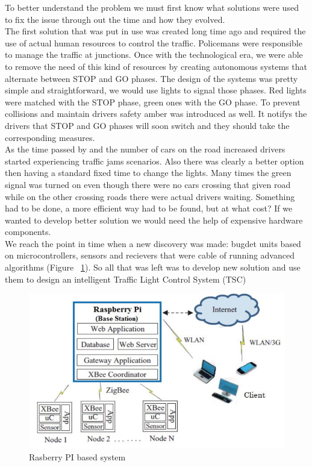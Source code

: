 \documentclass[17pt]{article}
\begin{document}
\indent \indent
To better understand the problem we must first know what solutions
were used to fix the issue through out the time and how they evolved.\\
\indent \indent
The first solution that was put in use was created long time ago and required
the use of actual human resources to control the traffic. Policemans were
responsible to manage the traffic at junctions. Once with the  technological
era, we were able to remove the need of this kind of resources by creating
autonomous systems that alternate between STOP and GO phases. The design of the 
systems was pretty simple and straightforward, we would use lights to signal 
those phases. Red lights were matched with the STOP phase, green ones with the
GO phase. To prevent collisions and maintain drivers safety amber was
introduced as well. It notifys the drivers that STOP and GO phases will soon
switch and they should take the corresponding measures.\\
\indent \indent
As the time passed by and the number of cars on the road increased drivers 
started experiencing traffic jams scenarios. Also there was clearly a better
option then having a standard fixed time to change the lights. Many times
the green signal was turned on even though there were no cars crossing that
given road while on the other crossing roads there were actual drivers waiting.
Something had to be done, a more efficient way had to be found, but at what
cost? If we wanted to develop better solution we would need the help of
expensive hardware components.\\
\indent \indent
We reach the point in time when a new discovery was made: bugdet units based
on  microcontrollers, sensors and recievers \cite{Deshmukh2016} that were
cable of running advanced algorithms (Figure ~\ref{fig:PI}). So all that was left was to develop 
new solution and use them to design an intelligent Traffic Light Control
System (TSC)\\
\begin{figure}[h!]
    \includegraphics[width=\textwidth]{PiSystems.png}
    \caption{Rasberry PI based system \textcopyright }
    \label{fig:PI}
\end{figure}
\\
\end{document}
